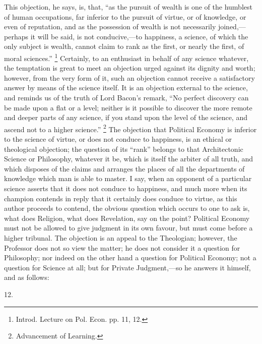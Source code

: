 This objection, he says, is, that, ``as the pursuit of wealth
is one of the humblest of human occupations, far inferior to the
pursuit of virtue, or of knowledge, or even of reputation, and as the
possession of wealth is not necessarily joined,—perhaps it will be
said, is not conducive,—to happiness, a science, of which the only
subject is wealth, cannot claim to rank as the first, or nearly the
first, of moral sciences.'' \footnote{Introd. Lecture on Pol. Econ. pp. 11, 12.} Certainly, to an enthusiast in behalf of any science whatever,
the temptation is great to meet an objection urged against its dignity
and worth; however, from the very form of it, such an objection cannot
receive a satisfactory answer by means of the science itself. It is an
objection external to the science, and reminds us of the truth of Lord
Bacon's remark, ``No perfect discovery can be made upon a flat or
a level; neither is it possible to discover the more remote and deeper
parts of any science, if you stand upon the level of the science, and
ascend not to a higher science.'' \footnote{Advancement of
Learning.} The objection that Political Economy is inferior to the science
of virtue, or does not conduce to happiness, is an ethical or
theological objection; the question of its ``rank'' belongs to
that Architectonic Science or Philosophy, whatever it be, which
is itself the arbiter of all truth, and which disposes of the claims
and arranges the places of all the departments of knowledge which man
is able to master. I say, when an opponent of a particular science
asserts that it does not conduce to happiness, and much more when its
champion contends in reply that it certainly does conduce to virtue,
as this author proceeds to contend, the obvious question which occurs
to one to ask is, what does Religion, what does Revelation, say on the
point? Political Economy must not be allowed to give judgment in its
own favour, but must come before a higher tribunal. The objection is
an appeal to the Theologian; however, the Professor does not so view
the matter; he does not consider it a question for Philosophy; nor
indeed on the other hand a question for Political Economy; not a
question for Science at all; but for Private Judgment,—so he answers
it himself, and as follows:

12.

